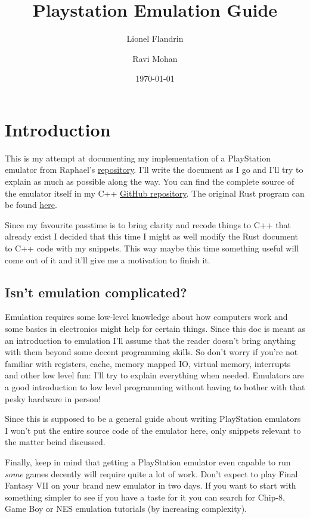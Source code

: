 \documentclass[a4paper]{article}
\title{Playstation Emulation Guide}
\date{\today}
\author{Lionel Flandrin \and Ravi Mohan}
\begin{document}
\maketitle
\newpage
\tableofcontents
\newpage

\section{Introduction}

This is my attempt at documenting my implementation of a PlayStation
emulator from Raphael's \href{https://github.com/raphaelthegreat/PSXemu}{repository}.
I'll write the document as I go and I'll try to explain as much as
possible along the way. You can find the complete source of the emulator
itself in my C++ \href{https://github.com/ravimohan1991/PSXemu}{GitHub repository}.
The original Rust program can be found
\href{https://github.com/simias/psx-rs}{here}.

Since my favourite passtime is to bring clarity  and recode things to
C++ that already exist I decided that this time I might as well modify
the Rust document to C++ code with my snippets. This way maybe this time
something useful will come out of it and it'll give me a motivation to
finish it.

\subsection{Isn't emulation complicated?}

Emulation requires some low-level knowledge about how computers work
and some basics in electronics might help for certain things. Since
this doc is meant as an introduction to emulation I'll assume that the
reader doesn't bring anything with them beyond some decent programming
skills. So don't worry if you're not familiar with registers, cache,
memory mapped IO, virtual memory, interrupts and other low level fun:
I'll try to explain everything when needed. Emulators are a good
introduction to low level programming without having to bother with
that pesky hardware in person!

Since this is supposed to be a general guide about writing PlayStation
emulators I won't put the entire source code of the emulator here,
only snippets relevant to the matter beind discussed.

Finally, keep in mind that getting a PlayStation emulator even capable
to run \emph{some} games decently will require quite a lot of work. Don't
expect to play Final Fantasy VII on your brand new emulator in two
days. If you want to start with something simpler to see if you have a
taste for it you can search for Chip-8, Game Boy or NES emulation
tutorials (by increasing complexity).
\end{document}
